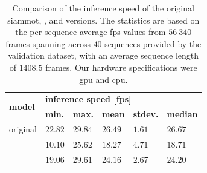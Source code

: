\begin{table}[!t]
    \centering
    \begin{tabular}{llllll}
        \toprule
        \multirow{2}{*}{\textbf{model}} & \multicolumn{5}{l}{\textbf{inference speed [\gls{fps}]}}                                                                     \\
                                        & \textbf{min.}                                            & \textbf{max.} & \textbf{mean} & \textbf{stdev.} & \textbf{median} \\
        \midrule
        original                        & $22.82$                                                  & $29.84$       & $26.49$       & $1.61$          & $26.67$         \\
        \fembmodel{}                    & $10.10$                                                  & $25.62$       & $18.27$       & $4.71$          & $18.71$         \\
        \dsamodel{}                     & $19.06$                                                  & $29.61$       & $24.16$       & $2.67$          & $24.20$         \\
        \bottomrule
    \end{tabular}
    \caption[\gls{dsa} extension inference time comparison]{Comparison of the inference speed of the original \gls{siammot}, \fembmodel{}, and \dsamodel{} versions. The statistics are based on the per-sequence average \gls{fps} values from $56\ 340$ frames spanning across $40$ sequences provided by the \uadetrac{} validation dataset, with an average sequence length of $1408.5$ frames. Our hardware specifications were \usedgpu{} \gls{gpu} and \usedcpu{} \gls{cpu}.}
    \label{tab:InferenceSpeedComparison}
\end{table}
